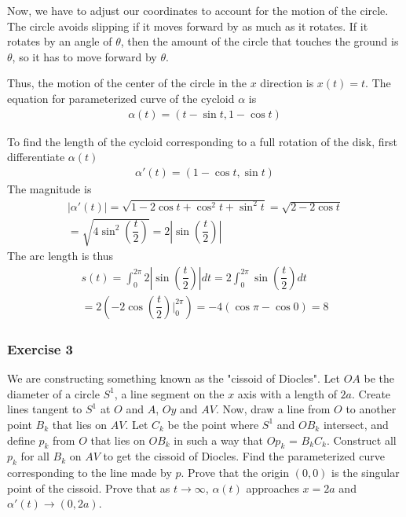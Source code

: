 \documentclass{article}
\begin{document}
	Now, we have to adjust our coordinates to account for the motion of the circle. The circle avoids slipping if it moves forward by as much as it rotates. If it rotates by an angle of $\theta$, then the amount of the circle that touches the ground is $\theta$, so it has to move forward by $\theta$.
	
	Thus, the motion of the center of the circle in the $x$ direction is $x(t) = t$. The equation for parameterized curve of the cycloid $\alpha$ is
	\begin{gather*}
		\alpha(t) = (t -\sin t, 1 - \cos t)
	\end{gather*}
	
	To find the length of the cycloid corresponding to a full rotation of the disk, first differentiate $\alpha(t)$
	\begin{gather*}
		\alpha'(t) = (1 - \cos t, \sin t)
	\end{gather*}
	The magnitude is
	\begin{gather*}
		| \alpha'(t) | = \sqrt{1 - 2\cos t + \cos^2 t + \sin^2 t} = \sqrt{2 - 2 \cos t} \\ 
		= \sqrt{4 \sin^2 \left( \dfrac{t}{2} \right)} = 2 \left| \sin \left( \dfrac{t}{2} \right) \right|
	\end{gather*}
	The arc length is thus
	\begin{gather*}
		s(t) = \int_{0}^{2\pi} 2 \left| \sin \left( \dfrac{t}{2} \right) \right| dt = 2 \int_{0}^{2\pi} \sin \left( \dfrac{t}{2} \right) dt \\
		= 2 \left( -2 \cos \left( \dfrac{t}{2} \right) \Biggr|_0^{2\pi} \right) = -4 \left( \cos \pi - \cos 0 \right) = 8
	\end{gather*}

	\subsubsection*{Exercise 3}
	We are constructing something known as the "cissoid of Diocles". Let $OA$ be the diameter of a circle $S^1$, a line segment on the $x$ axis with a length of $2a$. Create lines tangent to $S^1$ at $O$ and $A$, $Oy$ and $AV$. Now, draw a line from $O$ to another point $B_k$ that lies on $AV$. Let $C_k$ be the point where $S^1$ and $OB_k$ intersect, and define $p_k$ from $O$ that lies on $OB_k$ in such a way that $Op_k$ = $B_kC_k$. Construct all $p_k$ for all $B_k$ on $AV$ to get the cissoid of Diocles. Find the parameterized curve corresponding to the line made by $p$. Prove that the origin $(0, 0)$ is the singular point of the cissoid. Prove that as $t \to \infty$, $\alpha(t)$ approaches $x = 2a$ and $\alpha'(t) \to (0, 2a)$.
	
\end{document}
